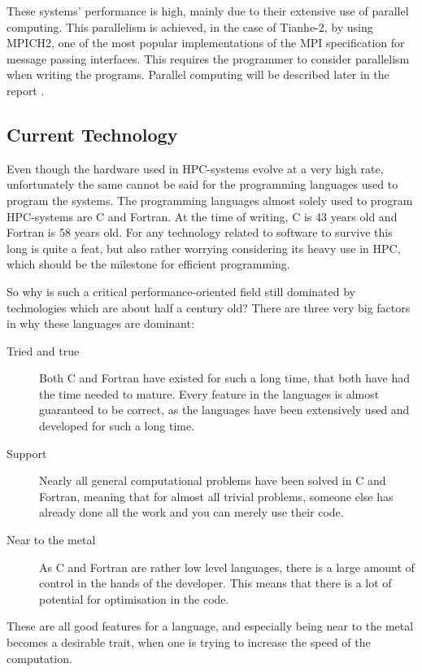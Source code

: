 These systems' performance is high, mainly due to their extensive use of parallel computing. This parallelism is achieved, in the case of Tianhe-2, by using MPICH2, one of the most popular implementations of the MPI specification for message passing interfaces. This requires the programmer to consider parallelism when writing the programs. Parallel computing will be described later in the report .

\subsection{Current Technology}

Even though the hardware used in HPC-systems evolve at a very high rate, unfortunately the same cannot be said for the programming languages used to program the systems. The programming languages almost solely used to program HPC-systems are C and Fortran. At the time of writing, C is 43 years old and Fortran is 58 years old. For any technology related to software to survive this long is quite a feat, but also rather worrying considering its heavy use in HPC, which should be the milestone for efficient programming.

So why is such a critical performance-oriented field still dominated by technologies which are about half a century old? There are three very big factors in why these languages are dominant:

\begin{description}
	\item [Tried and true]
	Both C and Fortran have existed for such a long time, that both have had the time needed to mature. Every feature in the languages is almost guaranteed to be correct, as the languages have been extensively used and developed for such a long time.
	\item [Support]
	Nearly all general computational problems have been solved in C and Fortran, meaning that for almost all trivial problems, someone else has already done all the work and you can merely use their code.
	\item [Near to the metal]
	As C and Fortran are rather low level languages, there is a large amount of control in the hands of the developer. This means that there is a lot of potential for optimisation in the code.
\end{description}

These are all good features for a language, and especially being near to the metal becomes a desirable trait, when one is trying to increase the speed of the computation. 

